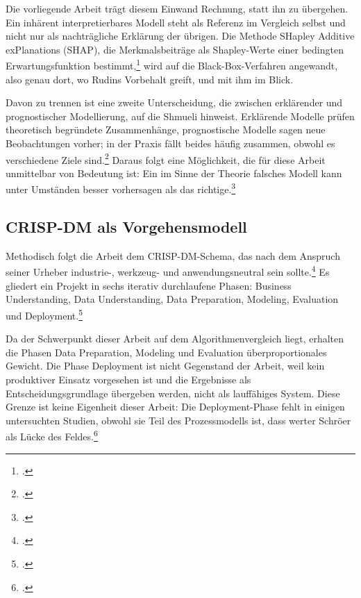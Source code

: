 \documentclass[12pt,a4paper]{article}
\begin{document}
Die vorliegende Arbeit trägt diesem Einwand Rechnung, statt ihn zu übergehen. Ein inhärent
interpretierbares Modell steht als Referenz im Vergleich selbst und nicht nur als nachträgliche
Erklärung der übrigen. Die Methode SHapley Additive exPlanations (SHAP), die Merkmalsbeiträge als
Shapley-Werte einer bedingten Erwartungsfunktion bestimmt,\footcite[4]{Lundberg2017} wird auf die
Black-Box-Verfahren angewandt, also genau dort, wo Rudins Vorbehalt greift, und mit ihm im Blick.

Davon zu trennen ist eine zweite Unterscheidung, die zwischen erklärender
und prognostischer Modellierung, auf die Shmueli hinweist. Erklärende Modelle prüfen theoretisch begründete Zusammenhänge,
prognostische Modelle sagen neue Beobachtungen vorher; in der Praxis fällt beides häufig zusammen,
obwohl es verschiedene Ziele sind.\footcite[291]{Shmueli2010} Daraus folgt eine Möglichkeit, die für
diese Arbeit unmittelbar von Bedeutung ist: Ein im Sinne der Theorie falsches Modell kann unter
Umständen besser vorhersagen als das richtige.\footcite[293]{Shmueli2010}


\subsection{CRISP-DM als Vorgehensmodell}
\label{sec:crispdm}


Methodisch folgt die Arbeit dem CRISP-DM-Schema, das nach dem Anspruch seiner Urheber industrie-,
werkzeug- und anwendungsneutral sein sollte.\footcite[3]{Chapman2000} Es gliedert ein Projekt in
sechs iterativ durchlaufene Phasen: Business Understanding, Data Understanding, Data Preparation,
Modeling, Evaluation und Deployment.\footcite[13]{Chapman2000}

Da der Schwerpunkt dieser Arbeit auf dem Algorithmenvergleich liegt, erhalten die Phasen Data Preparation, Modeling und
Evaluation überproportionales Gewicht. Die Phase Deployment ist nicht Gegenstand der Arbeit, weil kein
produktiver Einsatz vorgesehen ist und die Ergebnisse als Entscheidungsgrundlage übergeben werden,
nicht als lauffähiges System. Diese Grenze ist keine Eigenheit dieser Arbeit: Die Deployment-Phase fehlt in einigen untersuchten Studien, obwohl sie Teil
des Prozessmodells ist, dass werter Schröer als Lücke des Feldes.\footcite[531-532]{Schroeer2021}
\end{document}
